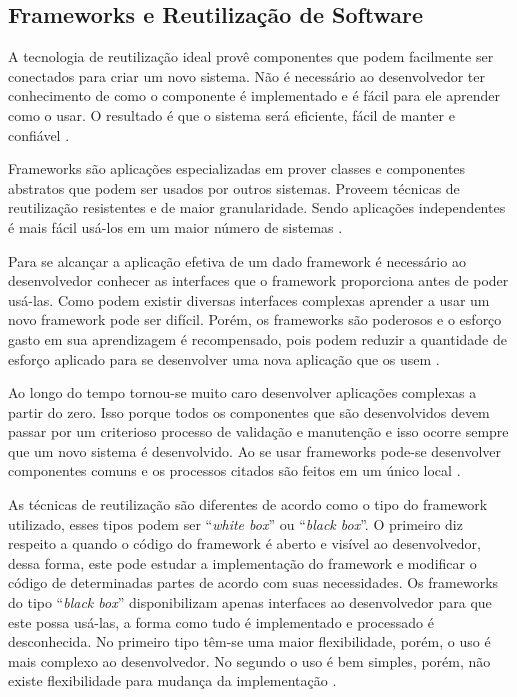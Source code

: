 \subsection{Frameworks e Reutilização de Software}

A tecnologia de reutilização ideal provê componentes que podem facilmente ser conectados para criar um novo sistema. Não é necessário ao desenvolvedor ter conhecimento de como o componente é implementado e é fácil para ele aprender como o usar. O resultado é que o sistema será eficiente, fácil de manter e confiável \cite{Johnson:1997}.

Frameworks são aplicações especializadas em prover classes e componentes abstratos que podem ser usados por outros sistemas. Proveem técnicas de reutilização resistentes e de maior granularidade. Sendo aplicações independentes é mais fácil usá-los em um maior número de sistemas \cite{Johnson:Foote:1988}.

Para se alcançar a aplicação efetiva de um dado framework é necessário ao desenvolvedor conhecer as interfaces que o framework proporciona antes de poder usá-las. Como podem existir diversas interfaces complexas aprender a usar um novo framework pode ser difícil. Porém, os frameworks são poderosos e o esforço gasto em sua aprendizagem é recompensado, pois podem reduzir a quantidade de esforço aplicado para se desenvolver uma nova aplicação que os usem \cite{Johnson:1997}.

Ao longo do tempo tornou-se muito caro desenvolver aplicações complexas a partir do zero. Isso porque todos os componentes que são desenvolvidos devem passar por um criterioso processo de validação e manutenção e isso ocorre sempre que um novo sistema é desenvolvido. Ao se usar frameworks pode-se desenvolver componentes comuns e os processos citados são feitos em um único local \cite{Fayad:Schimidt:1997}.

As técnicas de reutilização são diferentes de acordo como o tipo do framework utilizado, esses tipos podem ser ``\textit{white box}'' ou ``\textit{black box}''. O primeiro diz respeito a quando o código do framework é aberto e visível ao desenvolvedor, dessa forma, este pode estudar a implementação do framework e modificar o código de determinadas partes de acordo com suas necessidades. Os frameworks do tipo ``\textit{black box}'' disponibilizam apenas interfaces ao desenvolvedor para que este possa usá-las, a forma como tudo é implementado e processado é desconhecida. No primeiro tipo têm-se uma maior flexibilidade, porém, o uso é mais complexo ao desenvolvedor. No segundo o uso é bem simples, porém, não existe flexibilidade para mudança da implementação \cite{Kroth:2000}.

